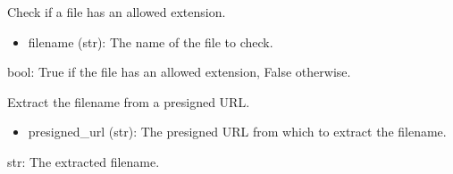 \documentclass[letterpaper,10pt,english]{sphinxmanual}
\begin{document}
\begin{fulllineitems}
\label{\detokenize{routes.images:routes.images.routes.allowed_file}}
\pysigstartsignatures
{}
\pysigstopsignatures
\sphinxAtStartPar
Check if a file has an allowed extension.
\begin{description}
\begin{itemize}
\item {} 
\sphinxAtStartPar
filename (str): The name of the file to check.

\end{itemize}

\sphinxAtStartPar
bool: True if the file has an allowed extension, False otherwise.

\end{description}

\end{fulllineitems}


\begin{fulllineitems}
\label{\detokenize{routes.images:routes.images.routes.extract_filename_from_presigned_url}}
\pysigstartsignatures
{}
\pysigstopsignatures
\sphinxAtStartPar
Extract the filename from a presigned URL.
\begin{description}
\begin{itemize}
\item {} 
\sphinxAtStartPar
presigned\_url (str): The presigned URL from which to extract the filename.

\end{itemize}

\sphinxAtStartPar
str: The extracted filename.

\end{description}

\end{fulllineitems}

\end{document}
